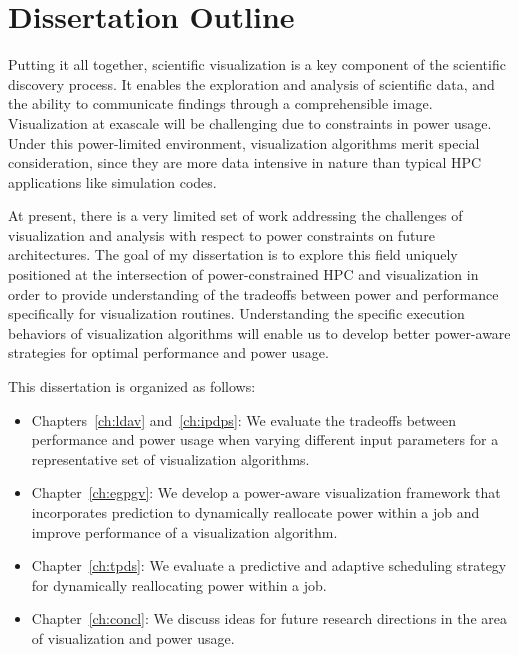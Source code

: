 \section{Dissertation Outline}

Putting it all together, scientific visualization is a key component of the
scientific discovery process.
%
It enables the exploration and analysis of scientific data, and the ability to
communicate findings through a comprehensible image.
%
Visualization at exascale will be challenging due to constraints in power
usage.
%
Under this power-limited environment, visualization algorithms merit special
consideration, since they are more data intensive in nature than typical HPC
applications like simulation codes.

At present, there is a very limited set of work addressing
the challenges of visualization and analysis with respect to power constraints
on future architectures.
%
The goal of my dissertation is to explore this field uniquely positioned at the
intersection of power-constrained HPC and visualization in order to provide
understanding of the tradeoffs between power and performance specifically for
visualization routines.
%
Understanding the specific execution behaviors of visualization algorithms will
enable us to develop better power-aware strategies for optimal performance and
power usage.

This dissertation is organized as follows:
\begin{itemize}
%
\item Chapters~\ref{ch:ldav} and~\ref{ch:ipdps}: We evaluate the tradeoffs
between performance and power usage when varying different input parameters for
a representative set of visualization algorithms.
%
\item Chapter~\ref{ch:egpgv}: We develop a power-aware visualization framework that
incorporates prediction to dynamically reallocate power within a job
and improve performance of a visualization algorithm.
%
\item Chapter~\ref{ch:tpds}: We evaluate a predictive and adaptive scheduling
strategy for dynamically reallocating power within a job.
%
\item Chapter~\ref{ch:concl}: We discuss ideas for future research directions
in the area of visualization and power usage.
%
\end{itemize}

